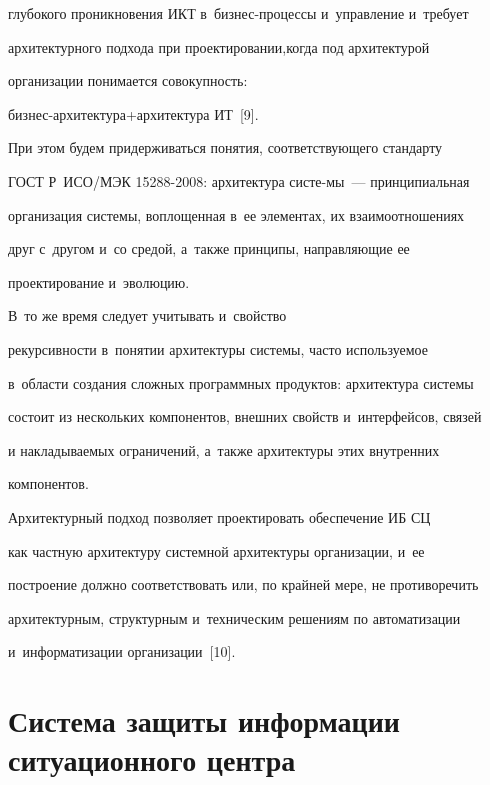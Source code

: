 глубокого проникновения ИКТ в~биз\-нес-про\-цес\-сы и~управление и~требует 

архитектурного подхода при проектировании,\linebreak когда под архитектурой 

организации понимается совокупность:  

биз\-нес-ар\-хи\-тек\-ту\-ра\;+\;ар\-хи\-тек\-ту\-ра ИТ~[9]. 


    При этом будем придерживаться понятия, соответствующего стандарту 

ГОСТ Р~ИСО/МЭК 15288-2008: архитектура сис\-те-\linebreak мы~--- принципиальная 

организация сис\-те\-мы, воплощенная в~ее элементах, их взаимоотношениях 

друг с~другом и~со средой, а~так\-же принципы, направляющие ее 

проектирование и~эволюцию. 



В~то же время следует учитывать и~свойство 

рекурсивности в~понятии архитектуры сис\-те\-мы, часто используемое 

в~области создания сложных программных продуктов: архитектура сис\-те\-мы 

состоит из нескольких компонентов, внешних свойств и~интерфейсов, связей 

и накладываемых ограничений, а~также архитектуры этих внутренних 

компонентов.

    

    Архитектурный подход позволяет проектировать обеспечение ИБ СЦ 

как частную архитектуру сис\-тем\-ной архитектуры организации, и~ее 

построение должно соответствовать или, по крайней мере, не противоречить 

архитектурным, структурным и~техническим решениям по автоматизации 

и~информатизации организации~[10].

    

    \vspace*{-4pt}

    

        \section{Система защиты информации ситуационного центра}

